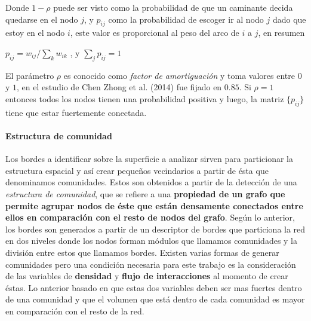 \documentclass[12pt]{article}
\begin{document}


Donde $1-\rho$ puede ser visto como la probabilidad de que un caminante decida quedarse en el nodo $j$, y $p_{ij}$ como la probabilidad de escoger ir al nodo $j$ dado que estoy en el nodo $i$, este valor es proporcional al peso del arco de $i$ a $j$, en resumen

\begin{center}
$	p_{ij}=w_{ij}/\sum\limits_k w_{ik}$ , y $\sum\limits_j p_{ij}= 1$
\end{center}


El parámetro $\rho$ es conocido como \textit{factor de amortiguación} y toma valores entre $0$ y $1$, en el estudio de Chen Zhong et al. (2014) fue fijado en $0.85$. Si $\rho=1$ entonces todos los nodos tienen una probabilidad positiva y luego, la matriz $\{p_{ij}\}$ tiene que estar fuertemente conectada.

	\paragraph{Estructura de comunidad}
	
	Los bordes a identificar sobre la superficie a analizar sirven para particionar la estructura espacial y así crear pequeños vecindarios a partir de ésta que denominamos comunidades. Estos son obtenidos a partir de la detección de una \textit{estructura de comunidad}, que se refiere a una \textbf{propiedad de un grafo que permite agrupar nodos de éste que están densamente conectados entre ellos en comparación con el resto de nodos del grafo}. Según lo anterior, los bordes son generados a partir de un descriptor de bordes que particiona la red en dos niveles donde los nodos forman módulos que llamamos comunidades y la división entre estos que llamamos bordes. Existen varias formas de generar comunidades pero una condición necesaria para este trabajo es la consideración de las variables  de \textbf{densidad} y \textbf{flujo de interacciones} al momento de crear éstas. Lo anterior basado en que estas dos variables deben ser mas fuertes dentro de una comunidad y que el volumen que está dentro de cada comunidad es mayor en comparación con el resto de la red.
	
\end{document}
